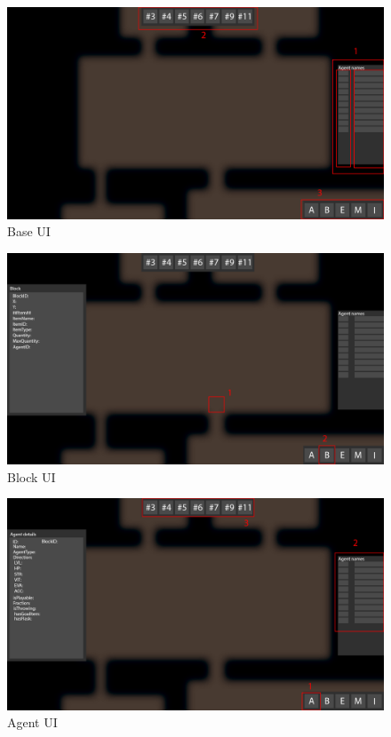 \begin{figure}[!ht]
	\centering
	\includegraphics[scale=0.2]{images/uibase.png}
	\caption{Base UI}
	\label{fig:baseui}
\end{figure}

\begin{figure}[!ht]
	\centering
	\includegraphics[scale=0.2]{images/uiblockmain.png}
	\caption{Block UI}
	\label{fig:blockui}
\end{figure}

\begin{figure}[!ht]
	\centering
	\includegraphics[scale=0.2]{images/uiagentmain.png}
	\caption{Agent UI}
	\label{fig:agentui}
\end{figure}

